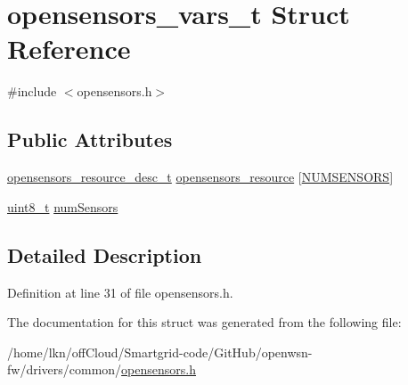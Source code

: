\hypertarget{structopensensors__vars__t}{}\section{opensensors\+\_\+vars\+\_\+t Struct Reference}
\label{structopensensors__vars__t}


{\ttfamily \#include $<$opensensors.\+h$>$}

\subsection*{Public Attributes}
\begin{DoxyCompactItemize}
\item 
\hyperlink{structopensensors__resource__desc__t}{opensensors\+\_\+resource\+\_\+desc\+\_\+t} \hyperlink{group___open_sensors_gae5c6304a53cdd102b08b8c369fe4af73}{opensensors\+\_\+resource} \mbox{[}\hyperlink{sensors_8h_a464fdb7834b9b30e4c1dfdf1134cd8cb}{N\+U\+M\+S\+E\+N\+S\+O\+RS}\mbox{]}
\item 
\hyperlink{_p_e___types_8h_aba7bc1797add20fe3efdf37ced1182c5}{uint8\+\_\+t} \hyperlink{group___open_sensors_gaec18c546c1947550d51927b99b225a10}{num\+Sensors}
\end{DoxyCompactItemize}


\subsection{Detailed Description}


Definition at line 31 of file opensensors.\+h.



The documentation for this struct was generated from the following file\+:\begin{DoxyCompactItemize}
\item 
/home/lkn/off\+Cloud/\+Smartgrid-\/code/\+Git\+Hub/openwsn-\/fw/drivers/common/\hyperlink{opensensors_8h}{opensensors.\+h}\end{DoxyCompactItemize}
